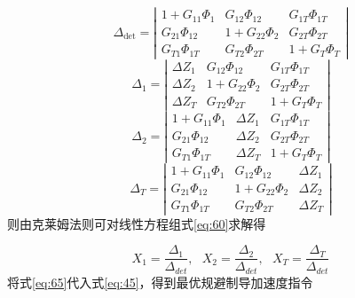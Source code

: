 \begin{equation}
\label{eq:61}
{\Delta _{\det }} = \left| {\begin{array}{*{20}{c}}
  {1 + {G_{11}}{\Phi _1}}&{{G_{12}}{\Phi _{12}}}&{{G_{1T}}{\Phi _{1T}}} \\ 
  {{G_{21}}{\Phi _{12}}}&{1 + {G_{22}}{\Phi _2}}&{{G_{2T}}{\Phi _{2T}}} \\ 
  {{G_{T1}}{\Phi _{1T}}}&{{G_{T2}}{\Phi _{2T}}}&{1 + {G_T}{\Phi _T}} 
\end{array}} \right|
\end{equation}
\begin{equation}
\label{eq:62}
{\Delta _1} = \left| {\begin{array}{*{20}{c}}
  {\Delta {Z_1}}&{{G_{12}}{\Phi _{12}}}&{{G_{1T}}{\Phi _{1T}}} \\ 
  {\Delta {Z_2}}&{1 + {G_{22}}{\Phi _2}}&{{G_{2T}}{\Phi _{2T}}} \\ 
  {\Delta {Z_T}}&{{G_{T2}}{\Phi _{2T}}}&{1 + {G_T}{\Phi _T}} 
\end{array}} \right|
\end{equation}
\begin{equation}
\label{eq:63}
{\Delta _2} = \left| {\begin{array}{*{20}{c}}
  {1 + {G_{11}}{\Phi _1}}&{\Delta {Z_1}}&{{G_{1T}}{\Phi _{1T}}} \\ 
  {{G_{21}}{\Phi _{12}}}&{\Delta {Z_2}}&{{G_{2T}}{\Phi _{2T}}} \\ 
  {{G_{T1}}{\Phi _{1T}}}&{\Delta {Z_T}}&{1 + {G_T}{\Phi _T}} 
\end{array}} \right|
\end{equation}
\begin{equation}
\label{eq:64}
{\Delta _T} = \left| {\begin{array}{*{20}{c}}
  {1 + {G_{11}}{\Phi _1}}&{{G_{12}}{\Phi _{12}}}&{\Delta {Z_1}} \\ 
  {{G_{21}}{\Phi _{12}}}&{1 + {G_{22}}{\Phi _2}}&{\Delta {Z_2}} \\ 
  {{G_{T1}}{\Phi _{1T}}}&{{G_{T2}}{\Phi _{2T}}}&{\Delta {Z_T}} 
\end{array}} \right|
\end{equation}
则由克莱姆法则可对线性方程组式\eqref{eq:60}求解得

\begin{equation}
\label{eq:65}
{X_1} = \frac{{{\Delta _1}}}{{{\Delta _{det}}}},{\text{ }}{X_2} = \frac{{{\Delta _2}}}{{{\Delta _{det}}}},{\text{ }}{X_T} = \frac{{{\Delta _T}}}{{{\Delta _{det}}}}
\end{equation}
将式\eqref{eq:65}代入式\eqref{eq:45}，得到最优规避制导加速度指令

